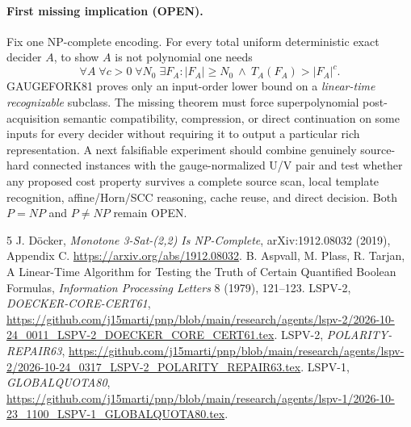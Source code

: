 \documentclass[11pt]{article}
\begin{document}
\paragraph{First missing implication (OPEN).}
Fix one NP-complete encoding. For every total uniform deterministic exact decider $A$, to show $A$ is not polynomial one needs
\[
\forall A\;\forall c>0\;\forall N_0\;\exists F_A:
|F_A|\ge N_0 \ \land\ T_A(F_A)>|F_A|^c.
\]
GAUGEFORK81 proves only an input-order lower bound on a \emph{linear-time recognizable} subclass. The missing theorem must force superpolynomial post-acquisition semantic compatibility, compression, or direct continuation on some inputs for every decider without requiring it to output a particular rich representation. A next falsifiable experiment should combine genuinely source-hard connected instances with the gauge-normalized U/V pair and test whether any proposed cost property survives a complete source scan, local template recognition, affine/Horn/SCC reasoning, cache reuse, and direct decision. Both $P=NP$ and $P\ne NP$ remain OPEN.

\begin{thebibliography}{5}
 J. D\"ocker, \emph{Monotone 3-Sat-(2,2) Is NP-Complete}, arXiv:1912.08032 (2019), Appendix C. \url{https://arxiv.org/abs/1912.08032}.
 B. Aspvall, M. Plass, R. Tarjan, A Linear-Time Algorithm for Testing the Truth of Certain Quantified Boolean Formulas, \emph{Information Processing Letters} 8 (1979), 121--123.
 LSPV-2, \emph{DOECKER-CORE-CERT61}, \url{https://github.com/j15marti/pnp/blob/main/research/agents/lspv-2/2026-10-24_0011_LSPV-2_DOECKER_CORE_CERT61.tex}.
 LSPV-2, \emph{POLARITY-REPAIR63}, \url{https://github.com/j15marti/pnp/blob/main/research/agents/lspv-2/2026-10-24_0317_LSPV-2_POLARITY_REPAIR63.tex}.
 LSPV-1, \emph{GLOBALQUOTA80}, \url{https://github.com/j15marti/pnp/blob/main/research/agents/lspv-1/2026-10-23_1100_LSPV-1_GLOBALQUOTA80.tex}.
\end{thebibliography}
\end{document}
